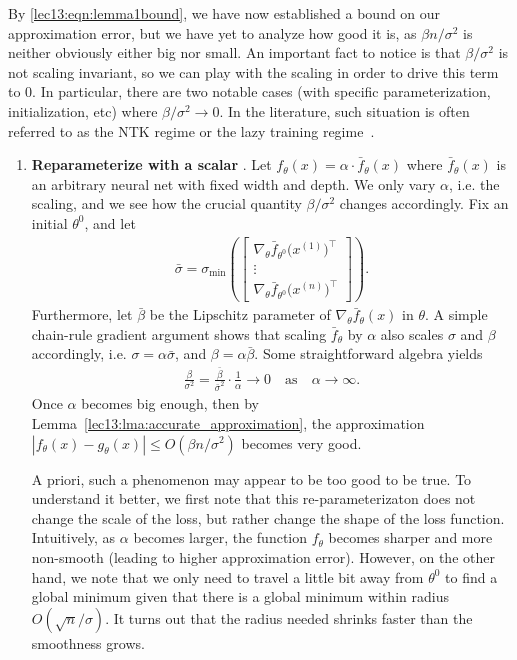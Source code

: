  \label{sec:ntk:two_examples}
By \eqref{lec13:eqn:lemma1bound}, we have now established a bound on our approximation error, but we have yet to analyze how good it is, as $\beta n /\sigma^2$ is neither obviously either big nor small. An important fact to notice is that $\beta/\sigma^2$ is not scaling invariant, so we can play with the scaling in order to drive this term to $0$. In particular, there are two notable cases (with specific parameterization, initialization, etc) where $\beta/\sigma^2 \to 0$. In the literature, such situation is often referred to as the NTK regime or the lazy training regime~\cite{chizat2018note}. 
\begin{enumerate}
    \item  \textbf{Reparameterize with a scalar} \cite{chizat2018note}. Let $f_\theta(x) = \alpha \cdot \bar{f}_\theta(x)$ where $\bar{f}_\theta(x)$ is an arbitrary neural net with fixed width and depth. We only vary $\alpha$, i.e. the scaling, and we see how the crucial quantity $\beta/\sigma^2$ changes accordingly. Fix an initial $\theta^0$, and let 
    \begin{align}
        \bar{\sigma} = \sigma_{\min}\left( \begin{bmatrix}  \nabla_\theta \bar{f}_{\theta^0} \big( x^{(1)} \big)^\top \\ \vdots \\ \nabla_\theta \bar{f}_{\theta^0} \big(x^{(n)} \big)^\top \end{bmatrix}\right).
    \end{align} 
    Furthermore, let $\bar{\beta}$ be the Lipschitz parameter of $\nabla_\theta \bar{f}_\theta(x)$ in $\theta$. A simple chain-rule gradient argument shows that scaling $\bar{f}_{\theta}$ by $\alpha$ also scales $\sigma$ and $\beta$ accordingly, i.e. $\sigma = \alpha \bar{\sigma}$, and $\beta = \alpha \bar{\beta}$. Some straightforward algebra yields 
    \begin{align} 
        \frac{\beta}{\sigma^2}= \frac{\bar{\beta}}{\bar{\sigma}^2} \cdot \frac{1}{\alpha} \to 0 \quad \text{as} \quad \alpha \to \infty.
    \end{align}
    Once $\alpha$ becomes big enough, then by Lemma~\ref{lec13:lma:accurate_approximation}, the approximation $|f_\theta(x) - g_\theta(x)| \leq O\left( \beta n / \sigma^2 \right)$ becomes very good. 
    
\begin{remark} A priori, such a phenomenon may appear to be too good to be true. To understand it better, we first note that this re-parameterizaton does not change the scale of the loss, but rather change the shape of the loss function. Intuitively, as $\alpha$ becomes larger, the function $f_\theta$ becomes sharper and more non-smooth (leading to higher approximation error). However, on the other hand, we note that we only need to travel a little bit away from $\theta^0$ to find a global minimum given that there is a global minimum within radius $O(\sqrt{n}/\sigma)$. It turns out that the radius needed shrinks faster than the smoothness grows. 
    

\end{remark}
\end{enumerate}
